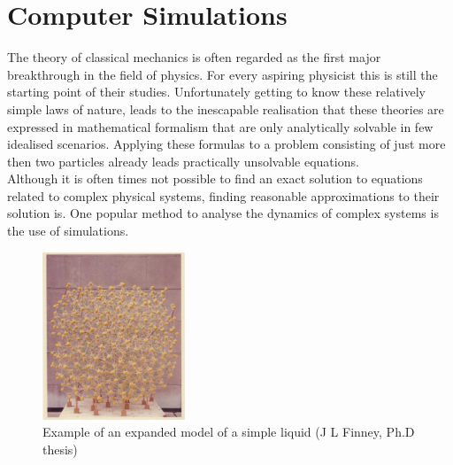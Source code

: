 \newpage
\section{Computer Simulations}

The theory of classical mechanics is often regarded as the first major breakthrough in
the field of physics. For every aspiring physicist this is still the starting point of
their studies. Unfortunately getting to know these relatively simple laws of nature,
leads to the inescapable realisation that these theories are expressed in mathematical
formalism that are only analytically solvable in few idealised scenarios. Applying these
formulas to a problem consisting of just more then two particles already leads
practically unsolvable equations.\\

Although it is often times not possible to find an exact solution to equations
related to complex physical systems, finding reasonable approximations to their solution
is. One popular method to analyse the dynamics of complex systems is the use of
simulations.\\

\begin{figure}
  \begin{center}
    \includegraphics[width=0.38\textwidth]{Figures/WaterModel.png}
  \end{center}
  \caption{Example of an expanded model of a simple liquid (J L Finney, Ph.D thesis)}
\end{figure}

